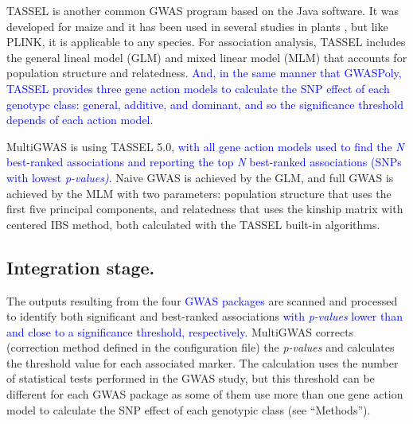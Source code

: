 \documentclass{article}
\begin{document}
TASSEL is another common GWAS program based on the Java software. It was developed for maize and it has been used in several studies in plants \cite{Alvarez2017,Zhang2018}, but like PLINK, it is applicable to any species. For association analysis, TASSEL includes the general lineal model (GLM) and mixed linear model (MLM) that accounts for population structure and relatedness. \textcolor{blue}{And, in the same manner that GWASPoly, TASSEL provides three gene action models to calculate the SNP effect of each genotypc class: general, additive, and dominant, and so the significance threshold depends of each action model.}

MultiGWAS is using TASSEL 5.0, \textcolor{blue}{with all gene action models used to find the }\textcolor{blue}{\emph{N }}\textcolor{blue}{best-ranked associations and reporting the top }\textcolor{blue}{\emph{N }}\textcolor{blue}{best-ranked associations (SNPs with lowest }\textcolor{blue}{\emph{p-values)}}\textcolor{blue}{.} Naive GWAS is achieved by the GLM, and full GWAS is achieved by the MLM with two parameters: population structure that uses the first five principal components, and relatedness that uses the kinship matrix with centered IBS method, both calculated with the TASSEL built-in algorithms. 

\subsection{Integration stage.}


The outputs resulting from the four \textcolor{blue}{GWAS packages} are scanned and processed to identify both significant and best-ranked associations \textcolor{blue}{with }\textcolor{blue}{\emph{p-values}}\textcolor{blue}{{} lower than and close to a significance threshold, respectively. }MultiGWAS corrects (correction method defined in the configuration file) the \emph{p-values} and calculates the threshold value for each associated marker. The calculation uses the number of statistical tests performed in the GWAS study, but this threshold can be different for each GWAS package as some of them use more than one gene action model to calculate the SNP effect of each genotypic class (see ``Methods'').
\end{document}
